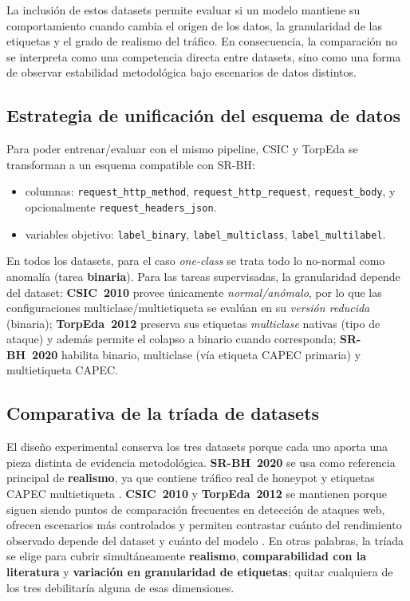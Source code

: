 \documentclass[12pt,oneside]{report}
\begin{document}
La inclusión de estos datasets permite evaluar si un modelo mantiene su comportamiento cuando cambia el origen de los datos, la granularidad de las etiquetas y el grado de realismo del tráfico. En consecuencia, la comparación no se interpreta como una competencia directa entre datasets, sino como una forma de observar estabilidad metodológica bajo escenarios de datos distintos.

\subsection{Estrategia de unificación del esquema de datos}
Para poder entrenar/evaluar con el mismo pipeline, CSIC y TorpEda se transforman a un esquema compatible con SR-BH:
\begin{itemize}[leftmargin=*]
  \item columnas: \texttt{request\_http\_method}, \texttt{request\_http\_request}, \texttt{request\_body}, y opcionalmente \texttt{request\_headers\_json}.
  \item variables objetivo: \texttt{label\_binary}, \texttt{label\_multiclass}, \texttt{label\_multilabel}.
\end{itemize}

En todos los datasets, para el caso \textit{one-class} se trata todo lo no-normal como anomalía (tarea \textbf{binaria}). Para las tareas supervisadas, la granularidad depende del dataset: \textbf{CSIC~2010} provee únicamente \textit{normal/anómalo}, por lo que las configuraciones multiclase/multietiqueta se evalúan en su \textit{versión reducida} (binaria); \textbf{TorpEda~2012} preserva sus etiquetas \textit{multiclase} nativas (tipo de ataque) y además permite el colapso a binario cuando corresponda; \textbf{SR-BH~2020} habilita binario, multiclase (vía etiqueta CAPEC primaria) y multietiqueta CAPEC.

\subsection{Comparativa de la tríada de datasets}
El diseño experimental conserva los tres datasets porque cada uno aporta una pieza distinta de evidencia metodológica. \textbf{SR-BH~2020} se usa como referencia principal de \textbf{realismo}, ya que contiene tráfico real de honeypot y etiquetas CAPEC multietiqueta \cite{srbh_dataverse,srbh_paper}. \textbf{CSIC~2010} y \textbf{TorpEda~2012} se mantienen porque siguen siendo puntos de comparación frecuentes en detección de ataques web, ofrecen escenarios más controlados y permiten contrastar cuánto del rendimiento observado depende del dataset y cuánto del modelo \cite{csic2010_impact,csic2010_doc,torpeda_2012}. En otras palabras, la tríada se elige para cubrir simultáneamente \textbf{realismo}, \textbf{comparabilidad con la literatura} y \textbf{variación en granularidad de etiquetas}; quitar cualquiera de los tres debilitaría alguna de esas dimensiones.
\end{document}
